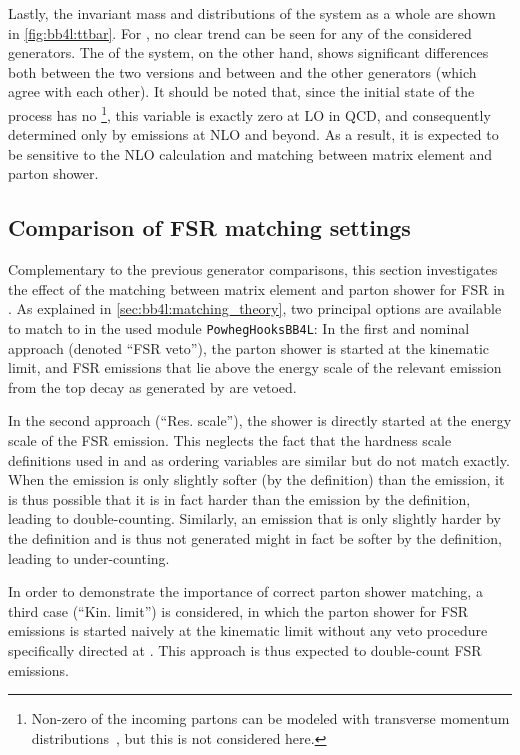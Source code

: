 Lastly, the invariant mass and \pt distributions of the \ttbar system as a whole are shown in \cref{fig:bb4l:ttbar}. For \mtt, no clear trend can be seen for any of the considered generators. The \pt of the \ttbar system, on the other hand, shows significant differences both between the two \bbfourl versions and between \bbfourl and the other generators (which agree with each other). It should be noted that, since the initial state of the \pptt process has no \pt\footnote{Non-zero \pt of the incoming partons can be modeled with transverse momentum distributions~\cite{Boer:2011fh}, but this is not considered here.}, this variable is exactly zero at LO in QCD, and consequently determined only by emissions at NLO and beyond. As a result, it is expected to be sensitive to the NLO calculation and matching between matrix element and parton shower.

\subsection{Comparison of FSR matching settings}
\label{sec:bb4l:matching}

Complementary to the previous generator comparisons, this section investigates the effect of the matching between matrix element and parton shower for FSR in \bbfourl. As explained in \cref{sec:bb4l:matching_theory}, two principal options are available to match \bbfourl to \pythia in the used module \texttt{PowhegHooksBB4L}: In the first and nominal approach (denoted ``FSR veto''), the parton shower is started at the kinematic limit, and FSR emissions that lie above the \powheg energy scale of the relevant emission from the top decay as generated by \powheg are vetoed.

In the second approach (``Res. scale''), the shower is directly started at the energy scale of the \powheg FSR emission. This neglects the fact that the hardness scale definitions used in \powheg and \pythia as ordering variables are similar but do not match exactly. When the \pythia emission is only slightly softer (by the \pythia definition) than the \powheg emission, it is thus possible that it is in fact harder than the \powheg emission by the \powheg definition, leading to double-counting. Similarly, an emission that is only slightly harder by the \pythia definition and is thus not generated might in fact be softer by the \powheg definition, leading to under-counting.

In order to demonstrate the importance of correct parton shower matching, a third case (``Kin. limit'') is considered, in which the parton shower for FSR emissions is started naively at the kinematic limit without any veto procedure specifically directed at \bbfourl. This approach is thus expected to double-count FSR emissions.

